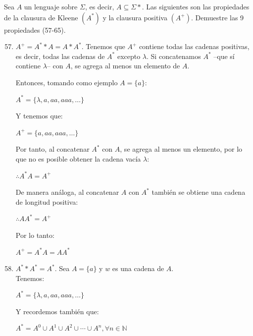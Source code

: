 Sea $A$ un lenguaje sobre $\Sigma$, es decir, $A \subseteq \Sigma{*}$. Las siguientes son las propiedades de la clausura de Kleene $(A^*)$ y la clausura positiva $(A^+)$. Demuestre las 9 propiedades (57-65).

\begin{enumerate}
    \setcounter{enumi}{56}
    \item $A^+ = A^* * A = A * A^*$.
        \subitem Tenemos que $A^+$ contiene todas las cadenas positivas, es decir, todas las cadenas de $A^*$ excepto $\lambda$. Si concatenamos $A^*$ --que sí contiene $\lambda$-- con $A$, se agrega al menos un elemento de $A$.
        
        Entonces, tomando como ejemplo $A=\{a\}$:
        \begin{center}
            $A^* = \{\lambda, a, aa, aaa, \ldots\}$
        \end{center}
        
        Y tenemos que:
        \begin{center}
            $A^+ = \{a, aa, aaa, \ldots\}$
        \end{center}
        
        Por tanto, al concatenar $A^*$ con $A$, se agrega al menos un elemento, por lo que no es posible obtener la cadena vacía $\lambda$:
        \begin{center}
            $\therefore A^*A=A^+$
        \end{center}
        
        De manera análoga, al concatenar $A$ con $A^*$ también se obtiene una cadena de longitud positiva:
        \begin{center}
            $\therefore AA^*=A^+$
        \end{center}
        
        Por lo tanto:
        \begin{center}
            $\boxed{A^+=A^*A=AA^*}$
        \end{center}
    \item $A^* * A^* = A^*$.
        \subitem Sea $A = \{a\}$ y $w$ es una cadena de $A$.\\
        
        Tenemos:
        \begin{center}
            $A^* = \{\lambda, a, aa, aaa, \ldots\}$
        \end{center}
        
        Y recordemos también que:
        \begin{center}
            $A^* = A^0 \cup A^1 \cup A^2 \cup \dotsm \cup A^n, \forall n \in \mathbb{N}$
        \end{center}
        

\end{enumerate}
